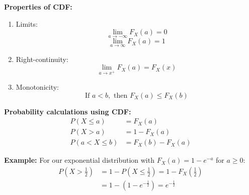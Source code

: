 \documentclass{article}
\begin{document}
    \begin{center}
    \end{center}

    \textbf{Properties of CDF:}
    \begin{enumerate}
        \item Limits:
        \[
            \lim_{a \to -\infty} F_X(a) = 0
        \]
        \[
            \lim_{a \to \infty} F_X(a) = 1
        \]
        \item Right-continuity:
        \[
            \lim_{a \to x^+} F_X(a) = F_X(x)
        \]
        \item Monotonicity:
        \[
            \text{If } a < b, \text{ then } F_X(a) \leq F_X(b)
        \]
    \end{enumerate}

    \textbf{Probability calculations using CDF:}
    \begin{align*}
        P(X \leq a) &= F_X(a) \\
        P(X > a) &= 1 - F_X(a) \\
        P(a < X \leq b) &= F_X(b) - F_X(a)
    \end{align*}

    \textbf{Example:} For our exponential distribution with $F_X(a) = 1 - e^{-a}$ for $a \geq 0$:
    \begin{align*}
        P(X > \frac{1}{2}) &= 1 - P(X \leq \frac{1}{2}) = 1 - F_X(\frac{1}{2}) \\
        &= 1 - (1 - e^{-\frac{1}{2}}) = e^{-\frac{1}{2}}
    \end{align*}
\end{document}
